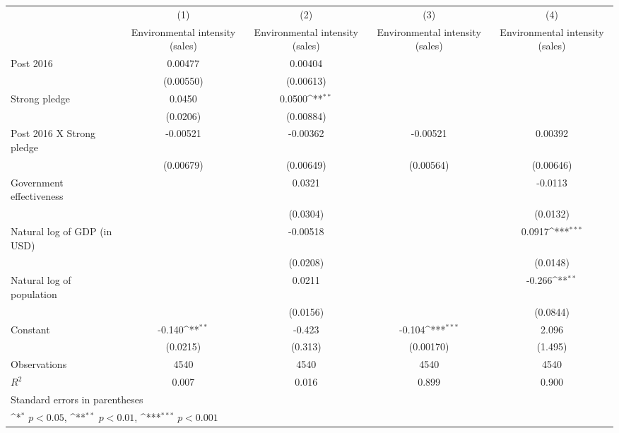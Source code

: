 {
\def\sym#1{\ifmmode^{#1}\else\(^{#1}\)\fi}
\begin{tabular}{l*{4}{c}}
\hline\hline
                    &\multicolumn{1}{c}{(1)}&\multicolumn{1}{c}{(2)}&\multicolumn{1}{c}{(3)}&\multicolumn{1}{c}{(4)}\\
                    &\multicolumn{1}{c}{Environmental intensity (sales)}&\multicolumn{1}{c}{Environmental intensity (sales)}&\multicolumn{1}{c}{Environmental intensity (sales)}&\multicolumn{1}{c}{Environmental intensity (sales)}\\
\hline
Post 2016           &     0.00477         &     0.00404         &                     &                     \\
                    &   (0.00550)         &   (0.00613)         &                     &                     \\
[1em]
Strong pledge       &      0.0450         &      0.0500\sym{**} &                     &                     \\
                    &    (0.0206)         &   (0.00884)         &                     &                     \\
[1em]
Post 2016 X Strong pledge&    -0.00521         &    -0.00362         &    -0.00521         &     0.00392         \\
                    &   (0.00679)         &   (0.00649)         &   (0.00564)         &   (0.00646)         \\
[1em]
Government effectiveness&                     &      0.0321         &                     &     -0.0113         \\
                    &                     &    (0.0304)         &                     &    (0.0132)         \\
[1em]
Natural log of GDP (in USD)&                     &    -0.00518         &                     &      0.0917\sym{***}\\
                    &                     &    (0.0208)         &                     &    (0.0148)         \\
[1em]
Natural log of population&                     &      0.0211         &                     &      -0.266\sym{**} \\
                    &                     &    (0.0156)         &                     &    (0.0844)         \\
[1em]
Constant            &      -0.140\sym{**} &      -0.423         &      -0.104\sym{***}&       2.096         \\
                    &    (0.0215)         &     (0.313)         &   (0.00170)         &     (1.495)         \\
\hline
Observations        &        4540         &        4540         &        4540         &        4540         \\
\(R^{2}\)           &       0.007         &       0.016         &       0.899         &       0.900         \\
\hline\hline
\multicolumn{5}{l}{\footnotesize Standard errors in parentheses}\\
\multicolumn{5}{l}{\footnotesize \sym{*} \(p<0.05\), \sym{**} \(p<0.01\), \sym{***} \(p<0.001\)}\\
\end{tabular}
}
